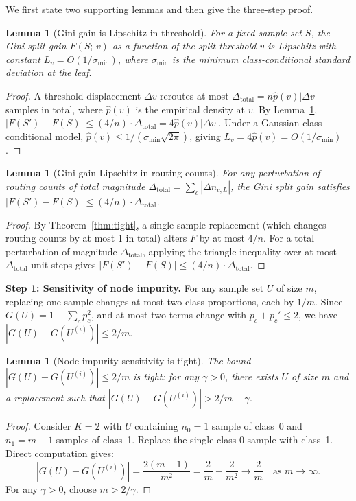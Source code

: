 \documentclass{article}
\newtheorem{lemma}[theorem]{Lemma}
\begin{document}
We first state two supporting lemmas and then give the three-step proof.

\begin{lemma}[Gini gain is Lipschitz in threshold]
\label{lem:gini-lipschitz}
For a fixed sample set $S$, the Gini split gain $F(S;\,v)$ as a function
of the split threshold $v$ is Lipschitz with constant
$L_v = O(1/\sigma_{\min})$, where $\sigma_{\min}$ is the minimum
class-conditional standard deviation at the leaf.
\end{lemma}

\begin{proof}
A threshold displacement $\Delta v$ reroutes at most
$\Delta_{\mathrm{total}} = n\hat{p}(v)|\Delta v|$ samples in total,
where $\hat{p}(v)$ is the empirical density at $v$.
By Lemma~\ref{lem:routing-lipschitz},
$|F(S') - F(S)| \leq (4/n)\cdot\Delta_{\mathrm{total}} = 4\hat{p}(v)|\Delta v|$.
Under a Gaussian class-conditional model,
$\hat{p}(v) \leq 1/(\sigma_{\min}\sqrt{2\pi})$,
giving $L_v = 4\hat{p}(v) = O(1/\sigma_{\min})$.
\end{proof}

\begin{lemma}[Gini gain Lipschitz in routing counts]
\label{lem:routing-lipschitz}
For any perturbation of routing counts of total magnitude
$\Delta_{\mathrm{total}} = \sum_c|\Delta n_{c,L}|$, the Gini split gain
satisfies $|F(S') - F(S)| \leq (4/n)\cdot\Delta_{\mathrm{total}}$.
\end{lemma}
\begin{proof}
By Theorem~\ref{thm:tight}, a single-sample replacement (which changes
routing counts by at most 1 in total) alters $F$ by at most $4/n$.
For a total perturbation of magnitude $\Delta_{\mathrm{total}}$, applying
the triangle inequality over at most $\Delta_{\mathrm{total}}$ unit steps
gives $|F(S') - F(S)| \leq (4/n)\cdot\Delta_{\mathrm{total}}$.
\end{proof}

\textbf{Step 1: Sensitivity of node impurity.}
For any sample set $U$ of size $m$, replacing one sample changes at most
two class proportions, each by $1/m$. Since $G(U) = 1 - \sum_c p_c^2$,
and at most two terms change with $p_c + p_c' \leq 2$, we have
$|G(U) - G(U^{(i)})| \leq 2/m$.

\begin{lemma}[Node-impurity sensitivity is tight]
\label{lem:impurity-tight}
The bound $|G(U) - G(U^{(i)})| \leq 2/m$ is tight: for any $\gamma > 0$,
there exists $U$ of size $m$ and a replacement such that
$|G(U) - G(U^{(i)})| > 2/m - \gamma$.
\end{lemma}
\begin{proof}
Consider $K = 2$ with $U$ containing $n_0 = 1$ sample of class~0 and
$n_1 = m-1$ samples of class~1. Replace the single class-0 sample with
class~1. Direct computation gives:
\[
  |G(U) - G(U^{(i)})| = \frac{2(m-1)}{m^2}
  = \frac{2}{m} - \frac{2}{m^2} \to \frac{2}{m} \quad \text{as } m \to \infty.
\]
For any $\gamma > 0$, choose $m > 2/\gamma$.
\end{proof}
\end{document}
